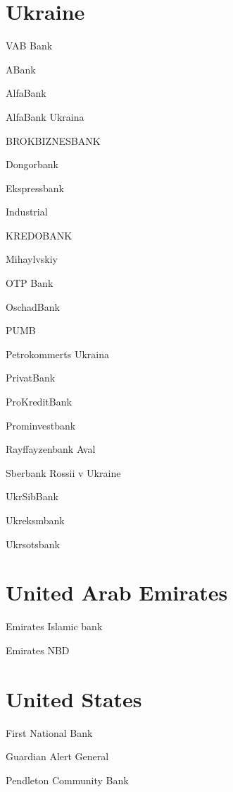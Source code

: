 \documentclass[a4paper,10pt,english]{sphinxmanual}
\begin{document}
\section{Ukraine}
\label{\detokenize{banks:ukraine}}
\sphinxAtStartPar
VAB Bank

\sphinxAtStartPar
ABank

\sphinxAtStartPar
AlfaBank

\sphinxAtStartPar
AlfaBank Ukraina

\sphinxAtStartPar
BROKBIZNESBANK

\sphinxAtStartPar
Dongorbank

\sphinxAtStartPar
Ekspressbank

\sphinxAtStartPar
Industrial

\sphinxAtStartPar
KREDOBANK

\sphinxAtStartPar
Mihaylvskiy

\sphinxAtStartPar
OTP Bank

\sphinxAtStartPar
OschadBank

\sphinxAtStartPar
PUMB

\sphinxAtStartPar
Petrokommerts Ukraina

\sphinxAtStartPar
PrivatBank

\sphinxAtStartPar
ProKreditBank

\sphinxAtStartPar
Prominvestbank

\sphinxAtStartPar
Rayffayzenbank Aval

\sphinxAtStartPar
Sberbank Rossii v Ukraine

\sphinxAtStartPar
UkrSibBank

\sphinxAtStartPar
Ukreksmbank

\sphinxAtStartPar
Ukrsotsbank


\section{United Arab Emirates}
\label{\detokenize{banks:united-arab-emirates}}
\sphinxAtStartPar
Emirates Islamic bank

\sphinxAtStartPar
Emirates NBD


\section{United States}
\label{\detokenize{banks:united-states}}
\sphinxAtStartPar
First National Bank

\sphinxAtStartPar
Guardian Alert General

\sphinxAtStartPar
Pendleton Community Bank
\end{document}
